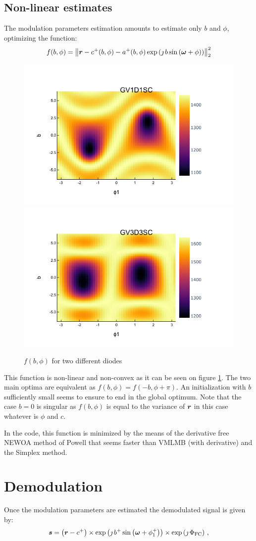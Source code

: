 \documentclass[a4paper,11pt,twoside]{scrartcl}
\begin{document}
\subsection{Non-linear estimates}
The modulation parameters estimation amounts to estimate only $b$  and $\phi$, optimizing the function:
\begin{equation}
   f(b,\phi) = \left\Vert \boldsymbol{r} -  c^+(b,\phi) - a^+(b,\phi) \exp\left( \jmath \, b \sin\left( \boldsymbol{\omega} + \phi\right)\right) \right\Vert_2^2\label{eq:nl}
\end{equation}
\begin{figure}
    \centering
    \includegraphics[width=0.45\linewidth]{figs/GV1D1SC.png}
    \includegraphics[width=0.45\linewidth]{figs/GV3D3SC.png}
    \caption{$f(b,\phi)$ for two different diodes}
    \label{fig:GV1D1SC}
\end{figure}

This function is non-linear and non-convex as it can be seen on figure \ref{fig:GV1D1SC}. The two main optima are equivalent as $f(b,\phi) =  f(-b,\phi+ \pi )$. An initialization with $b$ sufficiently small seems to ensure to end in the global optimum. Note that the case $b=0$ is singular  as $f(b,\phi)$ is equal to the variance of $\boldsymbol{r}$ in this case whatever is $\phi$  and $ c$.

In the code, this function is minimized by the means of the derivative free NEWOA method of Powell that seems faster than VMLMB (with derivative) and  the Simplex method.
\section{Demodulation}
Once the modulation parameters are estimated the demodulated signal is given by:
\begin{equation}
\boldsymbol{s} =\left(\boldsymbol{r} - c^+\right)\times\exp\left( \jmath \, b^+ \sin\left( \boldsymbol{\omega} + \phi^+_1\right)\right)\times\exp\left(\jmath\,\Phi_\textrm{FC}\right)\,,\label{eq:demodulation}
\end{equation}
\end{document}
